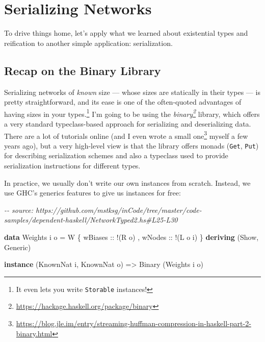 \documentclass[]{article}
\newenvironment{Shaded}{}{}
\newcommand{\CommentTok}[1]{\textcolor[rgb]{0.38,0.63,0.69}{\textit{#1}}}
\newcommand{\DataTypeTok}[1]{\textcolor[rgb]{0.56,0.13,0.00}{#1}}
\newcommand{\KeywordTok}[1]{\textcolor[rgb]{0.00,0.44,0.13}{\textbf{#1}}}
\newcommand{\NormalTok}[1]{#1}
\newcommand{\OperatorTok}[1]{\textcolor[rgb]{0.40,0.40,0.40}{#1}}
\newcommand{\OtherTok}[1]{\textcolor[rgb]{0.00,0.44,0.13}{#1}}
\renewcommand{\href}[2]{#2\footnote{\url{#1}}}
\begin{document}
\section{Serializing Networks}\label{serializing-networks}

To drive things home, let's apply what we learned about existential types and
reification to another simple application: serialization.

\subsection{Recap on the Binary Library}\label{recap-on-the-binary-library}

Serializing networks of \emph{known} size --- whose sizes are statically in
their types --- is pretty straightforward, and its ease is one of the
often-quoted advantages of having sizes in your types.\footnote{It even lets you
  write \texttt{Storable} instances!} I'm going to be using the
\emph{\href{https://hackage.haskell.org/package/binary}{binary}} library, which
offers a very standard typeclass-based approach for serializing and
deserializing data. There are a lot of tutorials online (and I even
\href{https://blog.jle.im/entry/streaming-huffman-compression-in-haskell-part-2-binary.html}{wrote
a small one} myself a few years ago), but a very high-level view is that the
library offers monads (\texttt{Get}, \texttt{Put}) for describing serialization
schemes and also a typeclass used to provide serialization instructions for
different types.

In practice, we usually don't write our own instances from scratch. Instead, we
use GHC's generics features to give us instances for free:

\begin{Shaded}
\begin{Highlighting}[]
\CommentTok{{-}{-} source: https://github.com/mstksg/inCode/tree/master/code{-}samples/dependent{-}haskell/NetworkTyped2.hs\#L25{-}L30}

\KeywordTok{data} \DataTypeTok{Weights}\NormalTok{ i o }\OtherTok{=} \DataTypeTok{W}\NormalTok{ \{}\OtherTok{ wBiases ::} \OperatorTok{!}\NormalTok{(}\DataTypeTok{R}\NormalTok{ o)}
\NormalTok{                     ,}\OtherTok{ wNodes  ::} \OperatorTok{!}\NormalTok{(}\DataTypeTok{L}\NormalTok{ o i)}
\NormalTok{                     \}}
  \KeywordTok{deriving}\NormalTok{ (}\DataTypeTok{Show}\NormalTok{, }\DataTypeTok{Generic}\NormalTok{)}

\KeywordTok{instance}\NormalTok{ (}\DataTypeTok{KnownNat}\NormalTok{ i, }\DataTypeTok{KnownNat}\NormalTok{ o) }\OtherTok{=\textgreater{}} \DataTypeTok{Binary}\NormalTok{ (}\DataTypeTok{Weights}\NormalTok{ i o)}
\end{Highlighting}
\end{Shaded}
\end{document}
